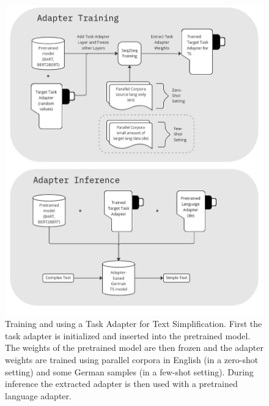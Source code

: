 \begin{figure}
    \centering
    \includegraphics[width=\textwidth]{./figures/adapter-setup.jpg}
    \caption{Training and using a Task Adapter for Text Simplification. First the task adapter is initialized and inserted
    into the pretrained model. The weights of the pretrained model are then frozen and the adapter weights are trained
    using parallel corpora in English (in a zero-shot setting) and some German samples (in a few-shot setting).
    During inference the extracted adapter is then used with a pretrained language adapter.}
    \label{fig:adapters}
\end{figure}

